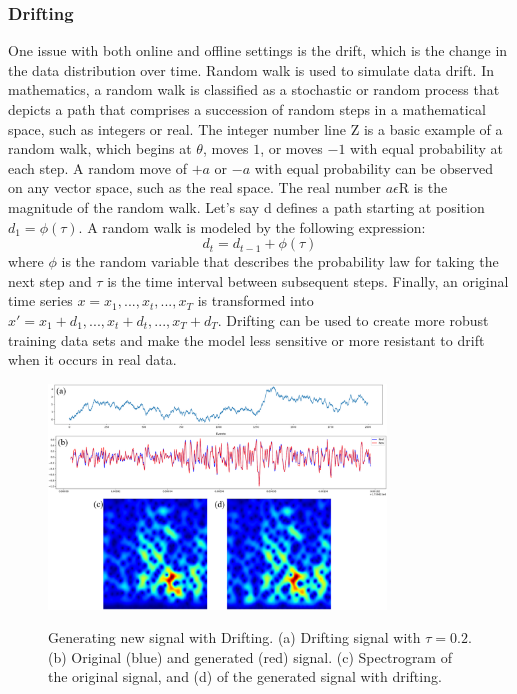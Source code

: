 \documentclass[journal]{IEEEtran}
\begin{document}
\subsubsection{Drifting}
One issue with both online and offline settings is the drift, which is the change in the data distribution over time. Random walk is used to simulate data drift. In mathematics, a random walk is classified as a stochastic or random process that depicts a path that comprises a succession of random steps in a mathematical space, such as integers or real. The integer number line $\mathrm{Z}$ is a basic example of a random walk, which begins at $\theta$, moves $1$, or moves $-1$ with equal probability at each step. A random move of $+a$ or $-a$ with equal probability can be observed on any vector space, such as the real space. The real number $a\epsilon\mathrm{R}$ is the magnitude of the random walk\cite{fields2019mitigating}.
Let's say d defines a path starting at position $d_1=\phi(\tau)$. A random walk is modeled by the following expression:
$$d_t=d_{t-1}+\phi(\tau)$$
where $\phi$ is the random variable that describes the probability law for taking the next step and $\tau$ is the time interval between subsequent steps. Finally, an original time series $x={x_1,...,x_t,...,x_T}$ is transformed into $x\prime={x_1+d_1,...,x_t+d_t,...,x_T+d_T}$.
Drifting can be used to create more robust training data sets and make the model less sensitive or more resistant to drift when it occurs in real data.
\begin{figure}
\centering
{\includegraphics[width=0.8\textwidth,keepaspectratio]{img/da_drifting.png}}
\caption{Generating new signal with Drifting. (a) Drifting signal with $\tau=0.2$. (b) Original (blue) and generated (red) signal. (c) Spectrogram of the original signal, and (d) of the generated signal with drifting.}
\label{fig:da_drifting}
\end{figure}
\end{document}
